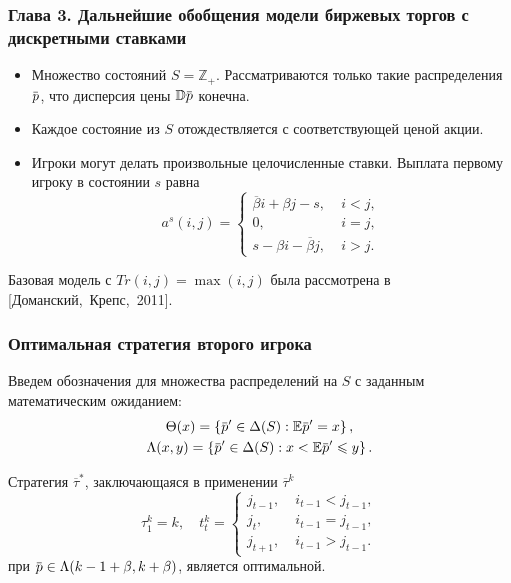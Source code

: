 \documentclass[12pt]{beamer}
\newcommand{\overbar}[1]{\mkern 1.5mu\overline{\mkern-1.3mu#1\mkern-1.3mu}\mkern 1.3mu}
\newcommand{\Co}{\beta}
\newcommand{\DCo}{\overline{\beta}}
\newcommand{\E}{\ensuremath{\mathbb{E}}}
\newcommand{\D}{\ensuremath{\mathbb{D}}}
\newcommand{\Z}{\mathbb{Z}}
\newcommand{\p}{\overbar{p}}
\newcommand{\tauv}{\overline{\tau}}
\begin{document}
\begin{frame}
  \frametitle{Глава 3. Дальнейшие обобщения модели биржевых торгов с дискретными ставками}

  \begin{itemize}
  \item 
    Множество состояний $S = \Z_+$.
    Рассматриваются только такие распределения $\p$, что дисперсия цены $\D \p$ конечна.
  \item
    Каждое состояние из $S$ отождествляется с соответствующей ценой акции.
  \item
    Игроки могут делать произвольные целочисленные ставки.
    Выплата первому игроку в состоянии $s$ равна
    \begin{equation*}
      a^s(i, j) =
      \begin{cases}
        \DCo i + \Co j - s, &\; i < j, \\
        0, &\; i = j, \\
        s - \Co i - \DCo j, &\; i > j.
      \end{cases}
    \end{equation*}
  \end{itemize}

  Базовая модель с $Tr(i, j) = \max(i, j)$ была рассмотрена в [Доманский,~Крепс,~2011].
\end{frame}

\begin{frame}
  \frametitle{Оптимальная стратегия второго игрока}
  Введем обозначения для множества распределений на $S$ с заданным математическим ожиданием:
  \begin{gather*}
    \Theta(x) = \left\{ \p' \in \Delta(S): \E \p' = x \right\},\\
    \Lambda(x, y) = \left\{ \p' \in \Delta(S): x < \E \p' \leqslant y \right\}.
  \end{gather*}

  Стратегия $\tauv^*$, заключающаяся в применении $\tauv^k$ 
  \begin{equation*}
    \tau^k_1 = k, \quad
    t^k_t = \begin{cases}
      j_{t-1}, &\; i_{t-1} < j_{t-1},\\
      j_t, &\; i_{t-1} = j_{t-1},\\
      j_{t+1}, &\; i_{t-1} > j_{t-1}.
    \end{cases}
  \end{equation*}
  при $\p \in \Lambda(k-1+\Co, k+\Co)$, является оптимальной. 
\end{frame}
\end{document}
